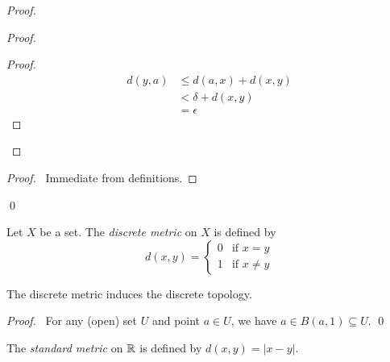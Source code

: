 \begin{proof}
    \pf
    \begin{proof}
        \begin{proof}
            \pf
            \begin{align*}
                d(y,a) & \leq d(a,x) + d(x,y) \\
                & < \delta + d(x,y) \\
                & = \epsilon
            \end{align*}
        \end{proof}
    \end{proof}
    \begin{proof}
        \pf\ Immediate from definitions.
    \end{proof}
    \qed
\end{proof}

\begin{definition}
    Let $X$ be a set. The \emph{discrete metric} on $X$ is defined by
    \[ d(x,y) = \begin{cases}
        0 & \text{if } x = y \\
        1 & \text{if } x \neq y
    \end{cases} \]
\end{definition}

\begin{proposition}
    The discrete metric induces the discrete topology.
\end{proposition}

\begin{proof}
    \pf\ For any (open) set $U$ and point $a \in U$, we have $a \in B(a,1) \subseteq U$. \qed
\end{proof}

\begin{definition}
    The \emph{standard metric} on $\mathbb{R}$ is defined by $d(x,y) = |x-y|$.
\end{definition}

